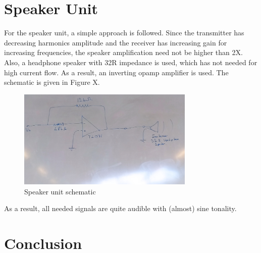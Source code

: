 \documentclass[letterpaper,12pt]{article}
\begin{document}
\section{Speaker Unit}
For the speaker unit, a simple approach is followed. Since the transmitter has decreasing harmonics amplitude and the receiver has increasing gain for increasing frequencies, the speaker amplification need not be higher than 2X. Also, a headphone speaker with 32R impedance is used, which has not needed for high current flow. As a result, an inverting opamp amplifier is used. The schematic is given in Figure X.
\begin{figure}[H]
    \centering
    \includegraphics[width = 0.75\textwidth]{speaker_schematic.jpg}
    \caption{Speaker unit schematic}
\end{figure}
As a result, all needed signals are quite audible with (almost) sine tonality. 
\section{Conclusion}
\end{document}
